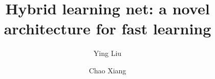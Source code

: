 \documentclass[3p,times,procedia]{elsarticle}
\begin{document}
\begin{frontmatter}




\title{Hybrid learning net: a novel architecture for fast learning}


\author[a]{Ying Liu}
\author[a]{Chao Xiang}

\address[a]{University of Chinese Academy of Sciences, Beijing 100049, China}


\end{frontmatter}
\end{document}
